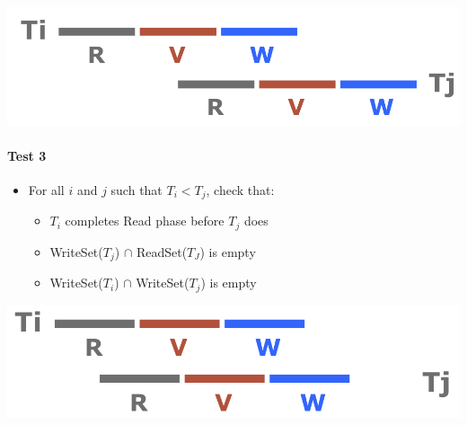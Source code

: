 \includegraphics[scale=0.15]{graphics/Test-2.png}

\paragraph{Test 3}
\begin{itemize}
\item For all $i$ and $j$ such that $T_i < T_j$, check that:
  \begin{itemize}
  \item $T_i$ completes Read phase before $T_j$ does
  \item WriteSet($T_j$) $\cap$ ReadSet($T_J$) is empty
  \item WriteSet($T_i$) $\cap$ WriteSet($T_j$) is empty
  \end{itemize}
\end{itemize}

\includegraphics[scale=0.15]{graphics/Test-3.png}


